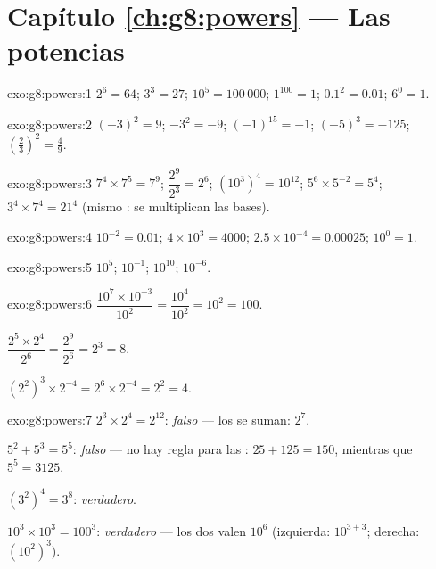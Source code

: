 \section*{Capítulo \ref{ch:g8:powers} --- Las potencias}

\begin{solution}{exo:g8:powers:1}
$2^6 = 64$; \quad $3^3 = 27$; \quad $10^5 = 100\,000$; \quad
$1^{100} = 1$; \quad $0.1^2 = 0.01$; \quad $6^0 = 1$.
\end{solution}

\begin{solution}{exo:g8:powers:2}
$(-3)^2 = 9$; \quad $-3^2 = -9$; \quad $(-1)^{15} = -1$; \quad
$(-5)^3 = -125$; \quad $\left(\frac23\right)^2 = \frac49$.
\end{solution}

\begin{solution}{exo:g8:powers:3}
$7^4 \times 7^5 = 7^9$; \quad
$\dfrac{2^9}{2^3} = 2^6$; \quad
$\left(10^3\right)^4 = 10^{12}$; \quad
$5^6 \times 5^{-2} = 5^4$; \quad
$3^4 \times 7^4 = 21^4$ (mismo : se multiplican las bases).
\end{solution}

\begin{solution}{exo:g8:powers:4}
$10^{-2} = 0.01$; \quad
$4 \times 10^3 = 4000$; \quad
$2.5 \times 10^{-4} = 0.00025$; \quad
$10^0 = 1$.
\end{solution}

\begin{solution}{exo:g8:powers:5}
$10^5$; \quad $10^{-1}$; \quad $10^{10}$; \quad $10^{-6}$.
\end{solution}

\begin{solution}{exo:g8:powers:6}
$\dfrac{10^7 \times 10^{-3}}{10^2} = \dfrac{10^4}{10^2} = 10^2 =
100$.

$\dfrac{2^5 \times 2^4}{2^6} = \dfrac{2^9}{2^6} = 2^3 = 8$.

$\left(2^2\right)^3 \times 2^{-4} = 2^6 \times 2^{-4} = 2^2 = 4$.
\end{solution}

\begin{solution}{exo:g8:powers:7}
$2^3 \times 2^4 = 2^{12}$: \emph{falso} --- los  se suman:
$2^7$.

$5^2 + 5^3 = 5^5$: \emph{falso} --- no hay regla para las :
$25 + 125 = 150$, mientras que $5^5 = 3125$.

$(3^2)^4 = 3^8$: \emph{verdadero}.

$10^3 \times 10^3 = 100^3$: \emph{verdadero} --- los dos valen $10^6$
(izquierda: $10^{3+3}$; derecha: $(10^2)^3$).
\end{solution}

